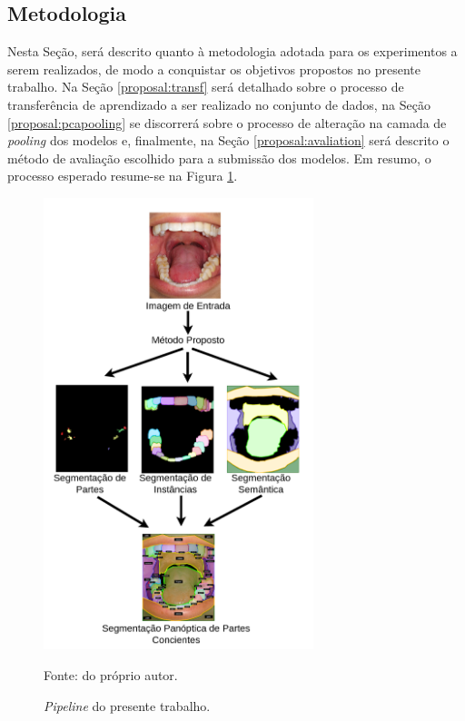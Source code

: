 \subsection{Metodologia}
\label{proposal:methodology}
Nesta Seção, será descrito quanto à metodologia adotada para os experimentos a serem realizados, de modo a conquistar os objetivos propostos no presente trabalho. Na Seção \ref{proposal:transf} será detalhado sobre o processo de transferência de aprendizado a ser realizado no conjunto de dados, na Seção \ref{proposal:pcapooling} se discorrerá sobre o processo de alteração na camada de \textit{pooling} dos modelos e, finalmente, na Seção \ref{proposal:avaliation} será descrito o método de avaliação escolhido para a submissão dos modelos. Em resumo, o processo esperado resume-se na Figura \ref{proposal:methodology:fig:1}.

\begin{figure}[H]
    \centering
    \caption{\textit{Pipeline} do presente trabalho.}
    \includegraphics[width=0.7\textwidth]{recursos/imagens/proposal/full_diagram.png}
    \label{proposal:methodology:fig:1}

    Fonte: do próprio autor.
\end{figure}

